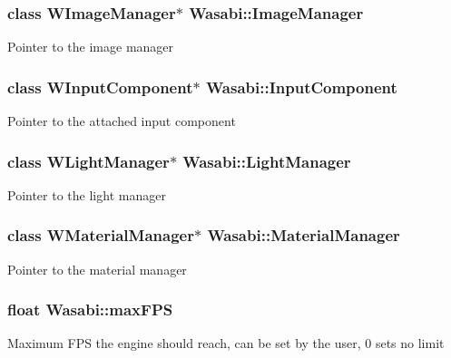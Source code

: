 \subsubsection[{\texorpdfstring{Image\+Manager}{ImageManager}}]{\setlength{\rightskip}{0pt plus 5cm}class {\bf W\+Image\+Manager}$\ast$ Wasabi\+::\+Image\+Manager}\hypertarget{class_wasabi_ad9d10e5810138d95baba904304f8cabd}{}\label{class_wasabi_ad9d10e5810138d95baba904304f8cabd}
Pointer to the image manager 
\subsubsection[{\texorpdfstring{Input\+Component}{InputComponent}}]{\setlength{\rightskip}{0pt plus 5cm}class {\bf W\+Input\+Component}$\ast$ Wasabi\+::\+Input\+Component}\hypertarget{class_wasabi_a201b5cd6407368ed579b1e48fd2b55f2}{}\label{class_wasabi_a201b5cd6407368ed579b1e48fd2b55f2}
Pointer to the attached input component 
\subsubsection[{\texorpdfstring{Light\+Manager}{LightManager}}]{\setlength{\rightskip}{0pt plus 5cm}class {\bf W\+Light\+Manager}$\ast$ Wasabi\+::\+Light\+Manager}\hypertarget{class_wasabi_ae21477374d8c2b7f39d0fe603796a23e}{}\label{class_wasabi_ae21477374d8c2b7f39d0fe603796a23e}
Pointer to the light manager 
\subsubsection[{\texorpdfstring{Material\+Manager}{MaterialManager}}]{\setlength{\rightskip}{0pt plus 5cm}class {\bf W\+Material\+Manager}$\ast$ Wasabi\+::\+Material\+Manager}\hypertarget{class_wasabi_a01d593a5bf9307f7f9d7147f4f363a0c}{}\label{class_wasabi_a01d593a5bf9307f7f9d7147f4f363a0c}
Pointer to the material manager 
\subsubsection[{\texorpdfstring{max\+F\+PS}{maxFPS}}]{\setlength{\rightskip}{0pt plus 5cm}float Wasabi\+::max\+F\+PS}\hypertarget{class_wasabi_ab2de064f8da21ad5474be7eb1884023d}{}\label{class_wasabi_ab2de064f8da21ad5474be7eb1884023d}
Maximum F\+PS the engine should reach, can be set by the user, 0 sets no limit 
